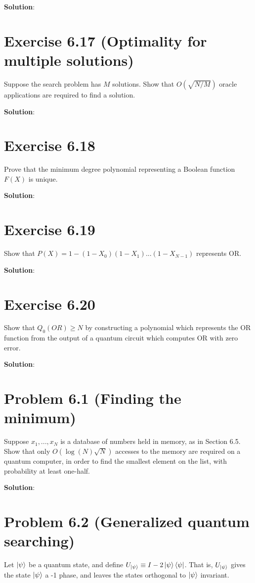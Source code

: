 \documentclass{book}
\begin{document}
        \textbf{Solution}:
        
    \section*{Exercise 6.17 (Optimality for multiple solutions)}
        Suppose the search problem has $M$ solutions. Show that $O(\sqrt{N/M})$ oracle applications are required to find a solution. 
        
        \textbf{Solution}:
        
    \section*{Exercise 6.18}
        Prove that the minimum degree polynomial representing a Boolean function $F(X)$ is unique. 
        
        \textbf{Solution}:
    
    \section*{Exercise 6.19}
        Show that $P(X) = 1-(1-X_0)(1-X_1)...(1-X_{N-1})$ represents OR. 
        
        \textbf{Solution}:
    
    \section*{Exercise 6.20}
        Show that $Q_0(OR)\geq N$ by constructing a polynomial which represents the OR function from the output of a quantum circuit which computes OR with zero error.
        
        \textbf{Solution}:
    
    \section*{Problem 6.1 (Finding the minimum)}
        Suppose $x_1,...,x_N$ is a database of numbers held in memory, as in Section 6.5. Show that only $O(\log(N)\sqrt{N})$ accesses to the memory are required on a quantum computer, in order to find the smallest element on the list, with probability at least one-half. 
        
        \textbf{Solution}:
    
    \section*{Problem 6.2 (Generalized quantum searching)}
        Let $\ket{\psi}$ be a quantum state, and define $U_{\ket{\psi}}\equiv I - 2\ket{\psi}\bra{\psi}$. That is, $U_{\ket{\psi}}$ gives the state $\ket{\psi}$ a -1 phase, and leaves the states orthogonal to $\ket{\psi}$ invariant. \par
        
\end{document}
